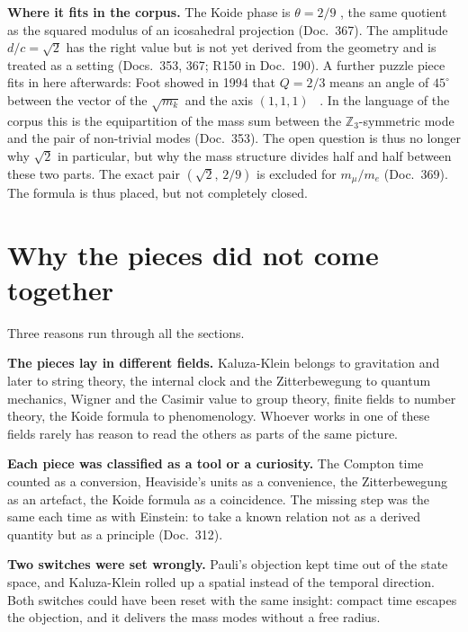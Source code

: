 \textbf{Where it fits in the corpus.} The Koide phase is $\theta=2/9$ \BM, the same quotient as the
squared modulus of an icosahedral projection (Doc.~367). The amplitude $d/c=\sqrt2$ has the right
value but is not yet derived from the geometry and is treated as a setting \SM{} (Docs.~353, 367;
R150 in Doc.~190). A further puzzle piece fits in here afterwards: Foot showed in 1994 that $Q=2/3$
means an angle of $45^\circ$ between the vector of the $\sqrt{m_k}$ and the axis $(1,1,1)$
\QM~\cite{Foot1994}. In the language of the corpus this is the equipartition of the mass sum between
the $\mathbb{Z}_3$-symmetric mode and the pair of non-trivial modes \BM{} (Doc.~353). The open
question is thus no longer why $\sqrt2$ in particular, but why the mass structure divides half and
half between these two parts. The exact pair $(\sqrt2,\,2/9)$ is excluded for $m_\mu/m_e$
(Doc.~369). The formula is thus placed, but not completely closed.

\section{Why the pieces did not come together}

Three reasons run through all the sections.

\textbf{The pieces lay in different fields.} Kaluza-Klein belongs to gravitation and later to
string theory, the internal clock and the Zitterbewegung to quantum mechanics, Wigner and the
Casimir value to group theory, finite fields to number theory, the Koide formula to phenomenology.
Whoever works in one of these fields rarely has reason to read the others as parts of the same
picture.

\textbf{Each piece was classified as a tool or a curiosity.} The Compton time counted as a
conversion, Heaviside's units as a convenience, the Zitterbewegung as an artefact, the Koide formula
as a coincidence. The missing step was the same each time as with Einstein: to take a known relation
not as a derived quantity but as a principle (Doc.~312).

\textbf{Two switches were set wrongly.} Pauli's objection kept time out of the state space, and
Kaluza-Klein rolled up a spatial instead of the temporal direction. Both switches could have been
reset with the same insight: compact time escapes the objection, and it delivers the mass modes
without a free radius.


